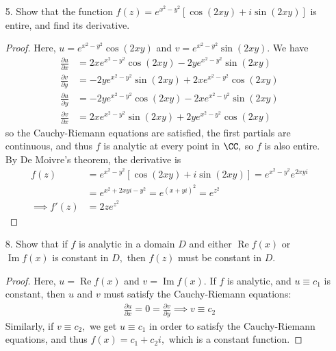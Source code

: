 \documentclass{article}
\DeclareMathOperator{\re}{Re}
\DeclareMathOperator{\im}{Im}
\begin{document}
\begin{itemize}
	\item[5.] Show that the function $f(z)=e^{x^2-y^2}\left[ \cos(2xy)+i\sin(2xy) \right]$ is entire, and find its derivative.
		\begin{proof}
			Here, $u=e^{x^2-y^2}\cos(2xy)$ and $v=e^{x^2-y^2}\sin(2xy).$ We have
			\begin{align*}
				\frac{\partial u}{\partial x} &= 2xe^{x^2-y^2}\cos(2xy) -2ye^{x^2-y^2}\sin(2xy) \\
				\frac{\partial v}{\partial y} &= -2ye^{x^2-y^2}\sin(2xy) + 2xe^{x^2-y^2}\cos(2xy) \\
				\frac{\partial u}{\partial y} &= -2ye^{x^2-y^2}\cos(2xy) - 2xe^{x^2-y^2}\sin(2xy) \\
				\frac{\partial v}{\partial x} &= 2xe^{x^2-y^2}\sin(2xy) + 2ye^{x^2-y^2}\cos(2xy) 
			\end{align*}
			so the Cauchy-Riemann equations are satisfied, the first partials are continuous, and thus $f$ is analytic at every point in $\CC,$ so $f$ is also entire. By De Moivre's theorem, the derivative is
			\begin{align*}
				f(z) &= e^{x^2-y^2}\left[ \cos(2xy)+i\sin(2xy) \right] = e^{x^2-y^2}e^{2xyi} \\
				&= e^{x^2+2xyi - y^2} = e^{(x+yi)^2} = e^{z^2} \\
				\implies f'(z) &= 2ze^{z^2}
			\end{align*}
		\end{proof}

	\item[8.] Show that if $f$ is analytic in a domain $D$ and either $\re f(x)$ or $\im f(x)$ is constant in $D,$ then $f(z)$ must be constant in $D.$
		\begin{proof}
			Here, $u=\re f(x)$ and $v=\im f(x).$ If $f$ is analytic, and $u\equiv c_1$ is constant, then $u$ and $v$ must satisfy the Cauchy-Riemann equations:
			\begin{align*}
				\frac{\partial u}{\partial x} = 0 = \frac{\partial v}{\partial y} \implies v \equiv c_2
			\end{align*}
			Similarly, if $v\equiv c_2,$ we get $u\equiv c_1$ in order to satisfy the Cauchy-Riemann equations, and thus $f(x)=c_1+c_2i,$ which is a constant function.
		\end{proof}


\end{itemize}
\end{document}
